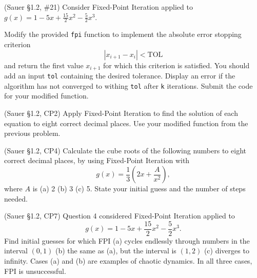\documentclass[12pt,fleqn]{exam}
\begin{document}
\begin{questions}

\question (Sauer \S1.2, \#21) Consider Fixed-Point Iteration applied to $g(x) = 1 - 5x + \frac{15}{2} x^2 - \frac{5}{2} x^3$.


\question Modify the provided \verb$fpi$ function to implement the absolute error stopping criterion
\[|x_{i+1}-x_i| < \mathrm{TOL}\]
and return the first value $x_{i+1}$ for which this criterion is satisfied. You should add an input \verb$tol$ containing the desired tolerance. Display an error if the algorithm has not converged to withing \verb$tol$ after \verb$k$ iterations. Submit the code for your modified function.

\question (Sauer \S1.2, CP2) Apply Fixed-Point Iteration to find the solution of each equation to eight correct decimal places. Use your modified function from the previous problem.


\newpage

\question (Sauer \S1.2, CP4) Calculate the cube roots of the following numbers to eight correct decimal places, by using Fixed-Point Iteration with 
\[\textstyle g(x) = \frac13\left(2x + \frac{A}{x^2}\right),\]
where $A$ is (a) 2 (b) 3 (c) 5. State your initial guess and the number of steps needed.

\question (Sauer \S1.2, CP7) Question 4 considered Fixed-Point Iteration applied to
\[\textstyle g(x) = 1 - 5x + \frac{15}{2} x^2 - \frac{5}{2} x^3.\]
Find initial guesses for which FPI (a) cycles endlessly through numbers in the interval $(0,1)$ (b) the same as (a), but the interval is $(1,2)$ (c) diverges to infinity. Cases (a) and (b) are examples of chaotic dynamics. In all three cases, FPI is unsuccessful.

\end{questions}
\end{document}
